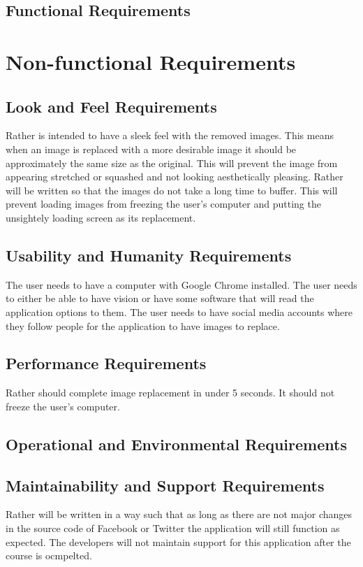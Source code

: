 \documentclass[12pt, titlepage]{article}
\begin{document}
\subsection{Functional Requirements}

\section{Non-functional Requirements}

\subsection{Look and Feel Requirements}
Rather is intended to have a sleek feel with the removed images. This means when an image is replaced with a more desirable image it should be approximately the same size as the original. This will prevent the image from appearing stretched or squashed and not looking aesthetically pleasing. Rather will be written so that the images do not take a long time to buffer. This will prevent loading images from freezing the user's computer and putting the unsightely loading screen as its replacement. 

\subsection{Usability and Humanity Requirements}
The user needs to have a computer with Google Chrome installed. The user needs to either be able to have vision or have some software that will read the application options to them. The user needs to have social media accounts where they follow people for the application to have images to replace. 

\subsection{Performance Requirements}
Rather should complete image replacement in under 5 seconds. It should not freeze the user's computer. 
\subsection{Operational and Environmental Requirements}

\subsection{Maintainability and Support Requirements}
Rather will be written in a way such that as long as there are not major changes in the source code of Facebook or Twitter the application will still function as expected. The developers will not maintain support for this application after the course is ocmpelted.
\end{document}
